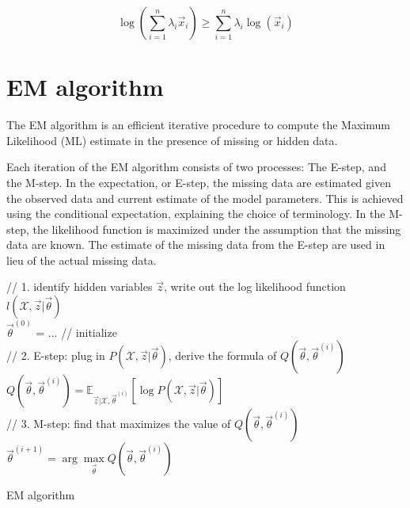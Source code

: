\begin{proposition}
\begin{equation}
\log\left(\sum\limits_{i=1}^n \lambda_i\vec{x}_i\right) \geq \sum\limits_{i=1}^n {\lambda_i \log(\vec{x}_i)}
\end{equation}
\end{proposition}


\section{EM algorithm}
The EM algorithm is an efficient iterative procedure to compute the Maximum Likelihood (ML) estimate in the presence of missing or hidden data. 

Each iteration of the EM algorithm consists of two processes: The E-step, and the M-step. In the expectation, or E-step, the missing data are estimated given the observed data and current estimate of the model parameters. This is achieved using the conditional expectation, explaining the choice of terminology. In the M-step, the likelihood function is maximized under the assumption that the missing data are known. The estimate of the missing data from the E-step are used in lieu of the actual missing data.

\begin{algorithm}[htbp]
    \SetAlgoNoLine

	// 1. identify hidden variables $\vec{z}$, write out the log likelihood function $l(\mathcal{X},\vec{z}|\vec{\theta})$ \\
	$\vec{\theta}^{(0)}$ = ... // initialize \\
	
	 {
	    // 2. E-step: plug in $P(\mathcal{X},\vec{z}|\vec{\theta})$, derive the formula of $Q(\vec{\theta}, \vec{\theta}^{(i)})$ \\
	    $Q(\vec{\theta}, \vec{\theta}^{(i)})=\mathbb{E}_{\vec{z}|\mathcal{X},\vec{\theta}^{(i)}}\left[\log P(\mathcal{X},\vec{z}|\vec{\theta})\right]$ \\
	    // 3. M-step: find \vec{\theta} that maximizes the value of $Q(\vec{\theta}, \vec{\theta}^{(i)})$ \\
		$\vec{\theta}^{(i+1)}=\arg\max\limits_{\vec{\theta}} Q(\vec{\theta}, \vec{\theta}^{(i)})$ \\
	}
	
\caption{EM algorithm}
\end{algorithm}

